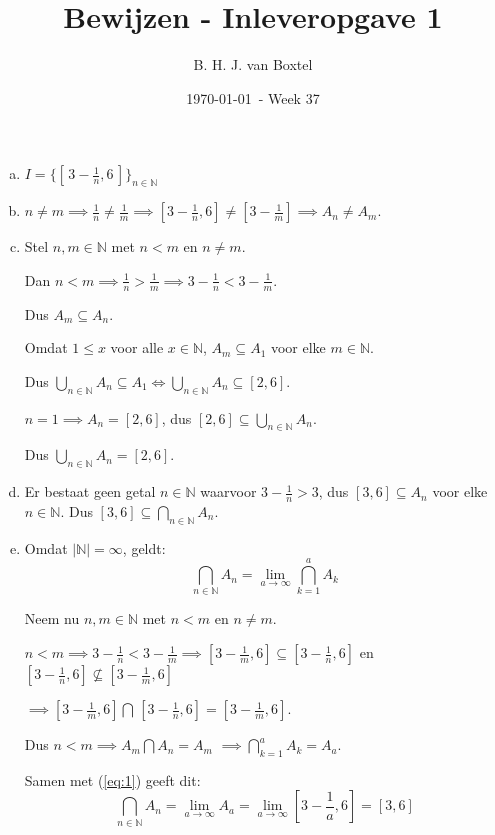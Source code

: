 \documentclass[12pt, a4paper]{article}
\begin{document}
\title{Bewijzen - Inleveropgave 1}
\author{B. H. J. van Boxtel}
\date{\today \, - Week 37} 

\maketitle
{} %

\begin{enumerate}[(a)] 
    \item $I = \{[\, 3 - \frac{1}{n}, 6 \,]\}_{n \in \mathbb{N}}$
    \bigskip
    \item $n \neq m \implies \frac{1}{n} \neq \frac{1}{m} \implies [3 -\frac{1}{n}, 6] \neq [3 - \frac{1}{m}] \implies A_n \neq A_m$.
    \bigskip
    \item Stel $n,m \in \mathbb{N}$ met $n < m$ en $n \neq m$.
    
    Dan $n < m \implies \frac{1}{n} > \frac{1}{m} \implies 3 - \frac{1}{n} < 3 - \frac{1}{m}$.

    Dus $A_m \subseteq A_n$.

    Omdat $1 \leq x$ voor alle $x \in \mathbb{N}$, $ A_m \subseteq A_1$ voor elke $m \in \mathbb{N}$.

    Dus $\bigcup_{n \in \mathbb{N}} A_n \subseteq A_1 \iff \bigcup_{n \in \mathbb{N}} A_n \subseteq [2,6]$.
    \bigskip

    $n = 1 \implies A_n = [2,6]$, dus $[2,6] \subseteq \bigcup_{n \in \mathbb{N}} A_n$.

    Dus $\bigcup_{n \in \mathbb{N}} A_n = [2,6]$.
    \bigskip

    \item Er bestaat geen getal $n \in \mathbb{N}$ waarvoor $3 - \frac{1}{n} > 3$, dus $[3,6] \subseteq A_n$ voor elke $n \in \mathbb{N}$. Dus $[3,6] \subseteq \bigcap_{n \in \mathbb{N}} A_n$.
    \bigskip

    \item Omdat $\lvert \mathbb{N} \rvert = \infty$, geldt:
    \begin{equation} \label{eq:1}
        \bigcap_{n \in \mathbb{N}} A_n = \lim_{a\to\infty}\bigcap_{k = 1}^{a} A_k
    \end{equation}

    Neem nu $n,m \in \mathbb{N}$ met $n < m$ en $n \neq m$.

    $n < m \implies 3 - \frac{1}{n} < 3 - \frac{1}{m} \implies [3 - \frac{1}{m}, 6] \subseteq [3 - \frac{1}{n}, 6]$ en $[3 - \frac{1}{n}, 6] \nsubseteq [3 - \frac{1}{m}, 6]$
    
    $\implies [3 - \frac{1}{m}, 6] \bigcap \, [3 - \frac{1}{n}, 6] = [3 - \frac{1}{m}, 6].$ 
    
    Dus $n < m \implies A_m \bigcap A_n = A_m$ $\implies \bigcap_{k = 1}^{a} A_k = A_a$.
    \bigskip

    Samen met (\ref{eq:1}) geeft dit:
    \begin{equation}
        \bigcap_{n \in \mathbb{N}} A_n = \lim_{a\to\infty}A_a = \lim_{a\to\infty} [3 - \frac{1}{a}, 6] = [3 , 6]
    \end{equation}

\end{enumerate}
\end{document}
